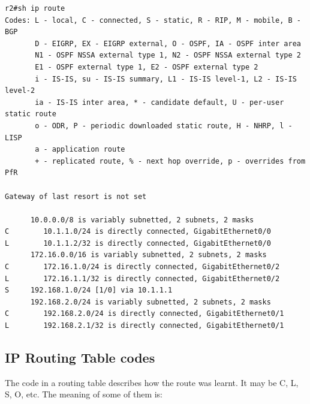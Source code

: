 \vspace{-15pt}
\begin{verbatim}
r2#sh ip route
Codes: L - local, C - connected, S - static, R - RIP, M - mobile, B - BGP
       D - EIGRP, EX - EIGRP external, O - OSPF, IA - OSPF inter area
       N1 - OSPF NSSA external type 1, N2 - OSPF NSSA external type 2
       E1 - OSPF external type 1, E2 - OSPF external type 2
       i - IS-IS, su - IS-IS summary, L1 - IS-IS level-1, L2 - IS-IS level-2
       ia - IS-IS inter area, * - candidate default, U - per-user static route
       o - ODR, P - periodic downloaded static route, H - NHRP, l - LISP
       a - application route
       + - replicated route, % - next hop override, p - overrides from PfR

Gateway of last resort is not set

      10.0.0.0/8 is variably subnetted, 2 subnets, 2 masks
C        10.1.1.0/24 is directly connected, GigabitEthernet0/0
L        10.1.1.2/32 is directly connected, GigabitEthernet0/0
      172.16.0.0/16 is variably subnetted, 2 subnets, 2 masks
C        172.16.1.0/24 is directly connected, GigabitEthernet0/2
L        172.16.1.1/32 is directly connected, GigabitEthernet0/2
S     192.168.1.0/24 [1/0] via 10.1.1.1
      192.168.2.0/24 is variably subnetted, 2 subnets, 2 masks
C        192.168.2.0/24 is directly connected, GigabitEthernet0/1
L        192.168.2.1/32 is directly connected, GigabitEthernet0/1
\end{verbatim}
\vspace{-10pt}

\subsection{IP Routing Table codes}
The code in a routing table describes how the route was learnt. It may be C, L, S, O, etc. The meaning of some of them is:

